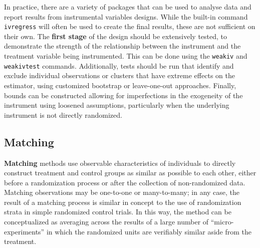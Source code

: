 In practice, there are a variety of packages that can be used
to analyse data and report results from instrumental variables designs.
While the built-in command \texttt{ivregress} will often be used
to create the final results, these are not sufficient on their own.
The \textbf{first stage} of the design should be extensively tested,
to demonstrate the strength of the relationship between
the instrument and the treatment variable being instrumented.\cite{stock2005weak}
This can be done using the \texttt{weakiv} and \texttt{weakivtest} commands.
Additionally, tests should be run that identify and exclude individual
observations or clusters that have extreme effects on the estimator,
using customized bootstrap or leave-one-out approaches.
Finally, bounds can be constructed allowing for imperfections
in the exogeneity of the instrument using loosened assumptions,
particularly when the underlying instrument is not directly randomized.


\subsection{Matching}

\textbf{Matching} methods use observable characteristics of individuals
to directly construct treatment and control groups as similar as possible
to each other, either before a randomization process
or after the collection of non-randomized data.
Matching observations may be one-to-one or many-to-many;
in any case, the result of a matching process
is similar in concept to the use of randomization strata
in simple randomized control trials.
In this way, the method can be conceptualized
as averaging across the results of a large number of ``micro-experiments''
in which the randomized units are verifiably similar aside from the treatment.

